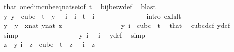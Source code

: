 \begin{isabellebody}
\ that\ one{\isacharunderscore}{\kern0pt}dim{\isacharunderscore}{\kern0pt}cube{\isacharunderscore}{\kern0pt}eq{\isacharunderscore}{\kern0pt}nat{\isacharunderscore}{\kern0pt}set{\isacharbrackleft}{\kern0pt}of\ {\isachardoublequoteopen}t{\isachardoublequoteclose}{\isacharbrackright}{\kern0pt}\ \isamarkupfalse%
\ bij{\isacharunderscore}{\kern0pt}betw{\isacharunderscore}{\kern0pt}def\ \isamarkupfalse%
\ blast\isanewline
\ \ \ \ \ \ \ \ \ \ \ \ \isamarkupfalse%
\ \isamarkupfalse%
\ {\isachardoublequoteopen}{\isasymexists}{\isacharbang}{\kern0pt}y{\isachardot}{\kern0pt}\ y\ {\isasymin}\ cube\ {}\ t\ {\isasymand}\ y\ {}\ {\isacharequal}{\kern0pt}\ i{\isachardoublequoteclose}\ \ {\isachardoublequoteopen}i\ {\isacharless}{\kern0pt}\ t{\isachardoublequoteclose}\ \ i\ \isanewline
\ \ \ \ \ \ \ \ \ \ \ \ \isamarkupfalse%
\ {\isacharparenleft}{\kern0pt}intro\ ex{}I{\isacharunderscore}{\kern0pt}alt{\isacharparenright}{\kern0pt}\isanewline
\ \ \ \ \ \ \ \ \ \ \ \ \ \ \isamarkupfalse%
\ y\ \ {\isachardoublequoteopen}y\ {\isasymequiv}\ {\isacharparenleft}{\kern0pt}{\isasymlambda}x{\isacharcolon}{\kern0pt}{\isacharcolon}{\kern0pt}nat{\isachardot}{\kern0pt}\ {\isasymlambda}y{\isasymin}{\isacharbraceleft}{\kern0pt}{\isachardot}{\kern0pt}{\isachardot}{\kern0pt}{\isacharless}{\kern0pt}{}{\isacharcolon}{\kern0pt}{\isacharcolon}{\kern0pt}nat{\isacharbraceright}{\kern0pt}{\isachardot}{\kern0pt}\ x{\isacharparenright}{\kern0pt}{\isachardoublequoteclose}\ \isanewline
\ \ \ \ \ \ \ \ \ \ \ \ \ \ \isamarkupfalse%
\ {\isachardoublequoteopen}y\ i\ {\isasymin}\ {\isacharparenleft}{\kern0pt}cube\ {}\ t{\isacharparenright}{\kern0pt}{\isachardoublequoteclose}\ \isamarkupfalse%
\ that\ \isamarkupfalse%
\ cube{\isacharunderscore}{\kern0pt}def\ y{\isacharunderscore}{\kern0pt}def\ \isamarkupfalse%
\ simp\isanewline
\ \ \ \ \ \ \ \ \ \ \ \ \ \ \isamarkupfalse%
\ \isamarkupfalse%
\ {\isachardoublequoteopen}y\ i\ {}\ {\isacharequal}{\kern0pt}\ i{\isachardoublequoteclose}\ \isamarkupfalse%
\ y{\isacharunderscore}{\kern0pt}def\ \isamarkupfalse%
\ simp\isanewline
\ \ \ \ \ \ \ \ \ \ \ \ \ \ \isamarkupfalse%
\ \isamarkupfalse%
\ {\isachardoublequoteopen}z\ {\isacharequal}{\kern0pt}\ y\ i{\isachardoublequoteclose}\ \ {\isachardoublequoteopen}z\ {\isasymin}\ cube\ {}\ t{\isachardoublequoteclose}\ \ {\isachardoublequoteopen}z\ {}\ {\isacharequal}{\kern0pt}\ i{\isachardoublequoteclose}\ \ z\isanewline

\end{isabellebody}
